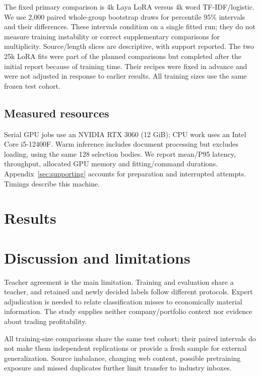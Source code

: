 \documentclass[11pt,a4paper]{article}
\begin{document}
The fixed primary comparison is 4k Laya LoRA versus 4k word TF-IDF/logistic.
We use 2,000 paired whole-group bootstrap draws for percentile 95\% intervals
and their differences. These intervals condition on a single fitted run;
they do not measure training instability or correct supplementary comparisons
for multiplicity. Source/length slices are descriptive, with support reported.
The two 25k LoRA fits were part of the planned comparisons but completed after
the initial report because of training time. Their recipes were fixed in advance
and were not adjusted in response to earlier results. All training sizes use the
same frozen test cohort.

\subsection{Measured resources}
Serial GPU jobs use an NVIDIA RTX 3060 (12 GiB); CPU work uses an Intel
Core i5-12400F. Warm inference includes document processing but excludes loading,
using the same 128 selection bodies. We report mean/P95 latency, throughput,
allocated GPU memory and fitting/command durations. Appendix~\ref{sec:supporting}
accounts for preparation and interrupted attempts. Timings describe this machine.

\FloatBarrier
\section{Results}
\suppressfloats[t]
\label{sec:results}


\section{Discussion and limitations}


Teacher agreement is the main limitation. Training and evaluation share a teacher,
and retained and newly decided labels follow different protocols. Expert
adjudication is needed to relate classification misses to economically material
information. The study supplies neither company/portfolio context nor evidence
about trading profitability.

All training-size comparisons share the same test cohort; their paired intervals
do not make them independent replications or provide a fresh sample for external
generalization. Source imbalance,
changing web content, possible pretraining exposure and missed duplicates further
limit transfer to industry inboxes.
\end{document}
